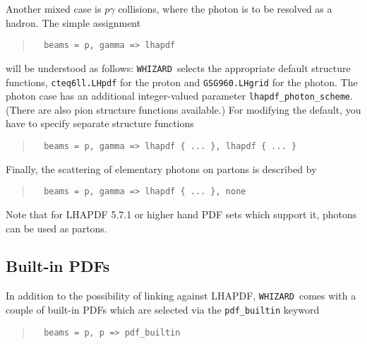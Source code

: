 \documentclass[12pt]{book}
\newcommand{\ttt}[1]{\texttt{#1}}
\newcommand{\whizard}{\texttt{WHIZARD}}
\begin{document}
Another mixed case is $p\gamma$ collisions, where the photon is to be
resolved as a hadron.  The simple assignment
\begin{quote}
\begin{footnotesize}
\begin{verbatim}
  beams = p, gamma => lhapdf
\end{verbatim}
\end{footnotesize}
\end{quote}
will be understood as follows: \whizard\ selects the appropriate default
structure functions, \ttt{cteq6ll.LHpdf} for the proton and
\ttt{GSG960.LHgrid} for the photon.  The photon case has an additional
integer-valued parameter \verb|lhapdf_photon_scheme|.  (There are also pion
structure functions available.)  For modifying the default, you have to
specify separate structure functions
\begin{quote}
\begin{footnotesize}
\begin{verbatim}
  beams = p, gamma => lhapdf { ... }, lhapdf { ... }
\end{verbatim}
\end{footnotesize}
\end{quote}
Finally, the scattering of elementary photons on partons is described by
\begin{quote}
\begin{footnotesize}
\begin{verbatim}
  beams = p, gamma => lhapdf { ... }, none
\end{verbatim}
\end{footnotesize}
\end{quote}

Note that for LHAPDF 5.7.1 or higher hand PDF sets which support it, photons can
be used as partons.

\subsection{Built-in PDFs}
\label{sec:built-in-pdf}

In addition to the possibility of linking against LHAPDF, \whizard\ comes with
a couple of built-in PDFs which are selected via the \verb?pdf_builtin? keyword
%
\begin{quote}
\begin{footnotesize}
\begin{verbatim}
  beams = p, p => pdf_builtin
\end{verbatim}
\end{footnotesize}
\end{quote}
%
\end{document}
